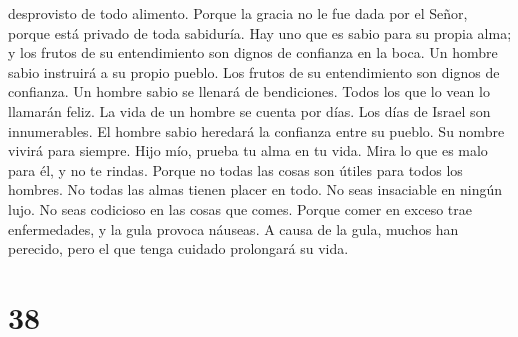 desprovisto de todo alimento.  Porque la gracia no le fue
dada por el Señor, porque está privado de toda sabiduría.
 Hay uno que es sabio para su propia alma; y los frutos
de su entendimiento son dignos de confianza en la boca. 
Un hombre sabio instruirá a su propio pueblo. Los frutos de su
entendimiento son dignos de confianza.  Un hombre sabio
se llenará de bendiciones. Todos los que lo vean lo llamarán feliz.
 La vida de un hombre se cuenta por días. Los días de
Israel son innumerables.  El hombre sabio heredará la
confianza entre su pueblo. Su nombre vivirá para siempre.
 Hijo mío, prueba tu alma en tu vida. Mira lo que es malo
para él, y no te rindas.  Porque no todas las cosas son
útiles para todos los hombres. No todas las almas tienen placer en todo.
 No seas insaciable en ningún lujo. No seas codicioso en
las cosas que comes.  Porque comer en exceso trae
enfermedades, y la gula provoca náuseas.  A causa de la
gula, muchos han perecido, pero el que tenga cuidado prolongará su vida.

\hypertarget{section-37}{%
\section{38}\label{section-37}}

